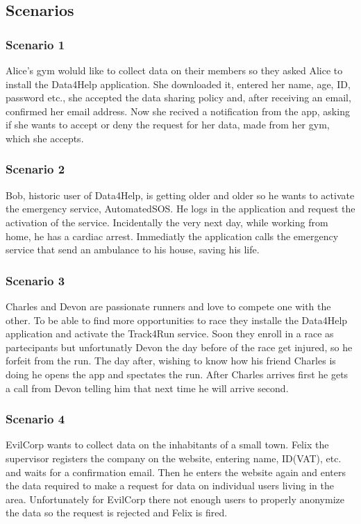 \subsection{Scenarios}
\subsubsection{Scenario 1}
Alice's gym woluld like to collect data on their members so they asked Alice to install the Data4Help application. She downloaded it, entered her name, age, ID, password etc., she accepted the data sharing policy and, after receiving an email, confirmed her email address. Now she recived a notification from the app, asking if she wants to accept or deny the request for her data, made from her gym, which she accepts.
\subsubsection{Scenario 2}
Bob, historic user of Data4Help, is getting older and older so he wants to activate the emergency service, AutomatedSOS. He logs in the application and request the activation of the service.
Incidentally the very next day, while working from home, he has a cardiac arrest. Immediatly the application calls the emergency service that send an ambulance to his house, saving his life.
\subsubsection{Scenario 3}
Charles and Devon are passionate runners and love to compete one with the other. To be able to find more opportunities to race they installe the Data4Help application and activate the Track4Run service. Soon they enroll in a race as partecipants but unfortunatly Devon the day before of the race get injured, so he forfeit from the run. The day after, wishing to know how his friend Charles is doing he opens the app and spectates the run. After Charles arrives first he gets a call from Devon telling him that next time he will arrive second.
\subsubsection{Scenario 4}
EvilCorp wants to collect data on the inhabitants of a small town. Felix the supervisor registers the company on the website, entering name, ID(VAT), etc. and waits for a confirmation email. Then he enters the website again and enters the data required to make a request for data on individual users living in the area. Unfortunately for EvilCorp there not enough users to properly anonymize the data so the request is rejected and Felix is fired.
